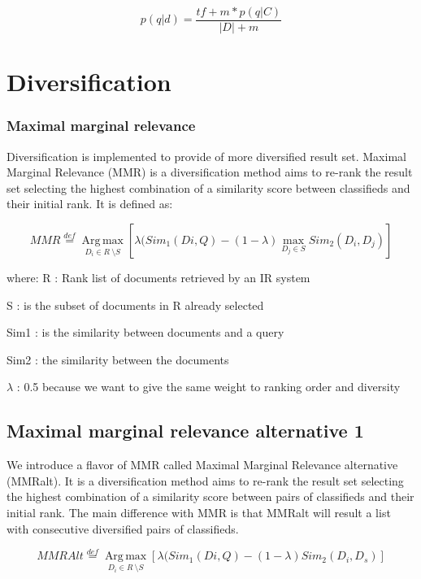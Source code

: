 \begin{equation}
p(q|d) =\frac{tf + m * p(q|C) }{|D| + m}
\end{equation}


\section{Diversification}

\subsubsection{Maximal marginal relevance}
Diversification is implemented to provide of more diversified result set. Maximal Marginal Relevance (MMR) is a diversification method aims to re-rank the result set selecting the highest combination of a similarity score between classifieds and their initial rank. It is defined as:


\begin{equation}
MMR\overset{def}{=}\operatorname*{Arg\, \max}_{D_{i} \in R\ \setminus S}[\lambda(Sim_{1}(Di,Q)-(1-\lambda)\underset{{D_{j}\in S}}{\max}Sim_{2}(D_{i},D_{j})]
\end{equation}

where:
R : Rank list of documents retrieved by an IR system

S : is the subset of documents in R already selected

Sim1 : is the similarity between documents and a query

Sim2 : the similarity between the documents

$\lambda$ : 0.5 because we want to give the same weight to ranking order and diversity


\subsection{Maximal marginal relevance alternative 1}

We introduce a flavor of MMR called Maximal Marginal Relevance alternative (MMRalt). It is a diversification method aims to re-rank the result set selecting the highest combination of a similarity score between pairs of classifieds and their initial rank. The main difference with MMR is that MMRalt will result a list with consecutive diversified pairs of classifieds. 


\bigskip

\begin{equation}
MMRAlt\overset{def}{=}\operatorname*{Arg \, \max}_{D_{i}\in R\ \setminus S}[\lambda(Sim_{1}(Di,Q)-(1-\lambda) Sim_{2}(D_{i},D_{s})]
\end{equation}


